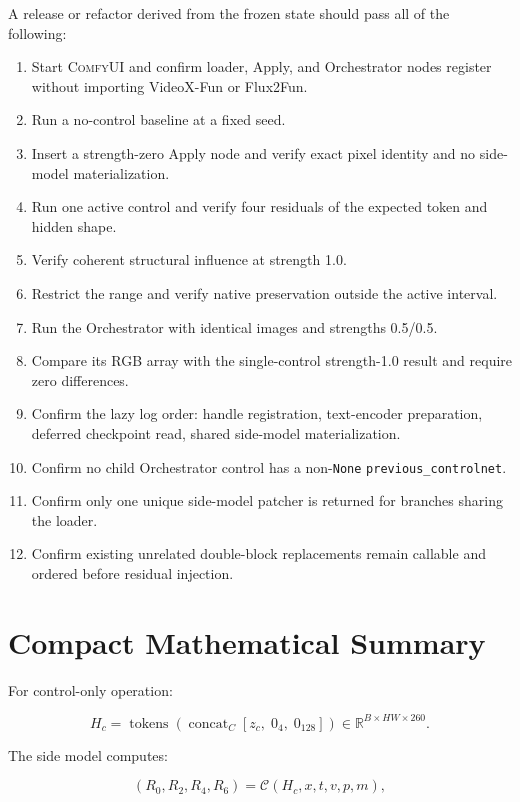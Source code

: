 \documentclass[11pt]{article}
\newcommand{\ComfyUI}{\textsc{ComfyUI}}
\newcommand{\code}[1]{\texttt{#1}}
\begin{document}
A release or refactor derived from the frozen state should pass all of the following:

\begin{enumerate}
  \item Start \ComfyUI{} and confirm loader, Apply, and Orchestrator nodes register without importing VideoX-Fun or Flux2Fun.
  \item Run a no-control baseline at a fixed seed.
  \item Insert a strength-zero Apply node and verify exact pixel identity and no side-model materialization.
  \item Run one active control and verify four residuals of the expected token and hidden shape.
  \item Verify coherent structural influence at strength 1.0.
  \item Restrict the range and verify native preservation outside the active interval.
  \item Run the Orchestrator with identical images and strengths 0.5/0.5.
  \item Compare its RGB array with the single-control strength-1.0 result and require zero differences.
  \item Confirm the lazy log order: handle registration, text-encoder preparation, deferred checkpoint read, shared side-model materialization.
  \item Confirm no child Orchestrator control has a non-\code{None} \code{previous\_controlnet}.
  \item Confirm only one unique side-model patcher is returned for branches sharing the loader.
  \item Confirm existing unrelated double-block replacements remain callable and ordered before residual injection.
\end{enumerate}

\section{Compact Mathematical Summary}

For control-only operation:

\[
  H_c = \operatorname{tokens}\left(
    \operatorname{concat}_{C}\left[z_c,\;0_{4},\;0_{128}\right]
  \right)
  \in \mathbb{R}^{B\times HW\times260}.
\]

The side model computes:

\[
  \left(R_0,R_2,R_4,R_6\right)
  = \mathcal{C}\left(H_c,x,t,v,p,m\right),
\]
\end{document}

